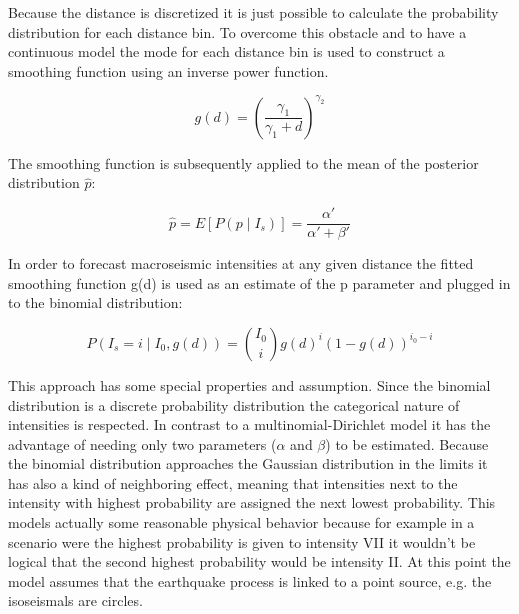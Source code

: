 Because the distance is discretized it is just possible to calculate the probability distribution for each distance bin. To overcome this obstacle and to have a continuous model the mode for each distance bin is used to construct a smoothing function using an inverse power function.

\begin{equation}
g(d) =  \left(\dfrac{\gamma_1}{\gamma_1 + d}\right)^{\gamma_2}
\label{eqn:smoothing}
\end{equation}

The smoothing function is subsequently applied to the mean of the posterior distribution $\hat{p}$:

\begin{equation}
\hat{p} = E\left[P(p \mid I_s)\right] = \dfrac{\alpha'}{\alpha' + \beta'}
\label{eqn:update}
\end{equation}

In order to forecast macroseismic intensities at any given distance the fitted smoothing function g(d) is used as an estimate of the p parameter and plugged in to the binomial distribution:


\begin{equation}
P(I_s = i\mid I_0, g(d)) = \binom{I_0}{i} g(d)^i(1-g(d))^{i_0-i}
\label{eqn:forecast}
\end{equation}

This approach has some special properties and assumption. Since the binomial distribution is a discrete probability distribution the categorical nature of intensities is respected. In contrast to a multinomial-Dirichlet model it has the advantage of needing only two parameters ($\alpha$ and $\beta$) to be estimated. Because the binomial distribution approaches the Gaussian distribution in the limits it has also a kind of neighboring effect, meaning that intensities next to the intensity with highest probability are assigned the next lowest probability. This models actually some reasonable physical behavior because for example in a scenario were the highest probability is given to intensity VII it wouldn't be logical that the second highest probability would be intensity II. At this point the model assumes that the earthquake process is linked to a point source, e.g. the isoseismals are circles.\\

